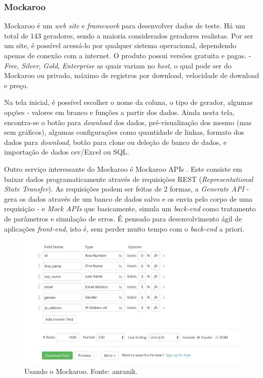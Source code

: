 \documentclass[
	12pt,				%
	openright,			%
	twoside,			%
	a4paper,			%
	english,			%
	brazil				%
	]{abntex2}
\begin{document}
	\subsubsection{Mockaroo}
	Mockaroo \cite{mockaroo} é um \emph{web site} e \emph{framework} para desenvolver dados de teste.
	Há um total de 143 geradores, sendo a maioria considerados geradores realistas.
	Por ser um site, é possível acessá-lo por qualquer sistema operacional, dependendo apenas de conexão com a internet.
	O produto possui versões gratuita e pagas. - \emph{Free}, \emph{Silver}, \emph{Gold}, \emph{Enterprise} as quais variam no \emph{host}, o qual pode ser do Mockaroo ou privado, máximo de registros por download, velocidade de download e preço.
	\par
	Na tela inicial, é possível escolher o nome da coluna, o tipo de gerador, algumas opções - valores em branco e funções a partir dos dados.
	Ainda nesta tela, encontra-se o botão para \emph{download} dos dados, pré-visualização dos mesmo (mas sem gráficos), algumas configurações como quantidade de linhas, formato dos dados para \emph{download}, botão para clone ou deleção de banco de dados, e importação de dados csv/Excel ou SQL.
	\par
	Outro serviço interessante do Mockaroo é Mockaroo APIs \cite{mockarooAPI}.
	Este consiste em baixar dados programaticamente através de requisições REST (\emph{Representational State Transfer}).
	As requisições podem ser feitas de 2 formas, a \emph{Generate API} - gera os dados através de um banco de dados salvo e os envia pelo corpo de uma requisição - 
	e \emph{Mock APIs} que basicamente, simula um \emph{back-end} como tratamento de parâmetros e simulação de erros. 
	É pensado para desenvolvimento ágil de aplicações \emph{front-end}, isto é, sem perder muito tempo com o \emph{back-end} a priori.
	\begin{figure}[h]
		\centering
		\includegraphics[width=\linewidth]{./figures/TrabalhosRelacionados/mockaroo.jpg}
		\caption{Usando o Mockaroo. Fonte: anranik.}
		\label{fig:mockaroo}
	\end{figure}
\end{document}

